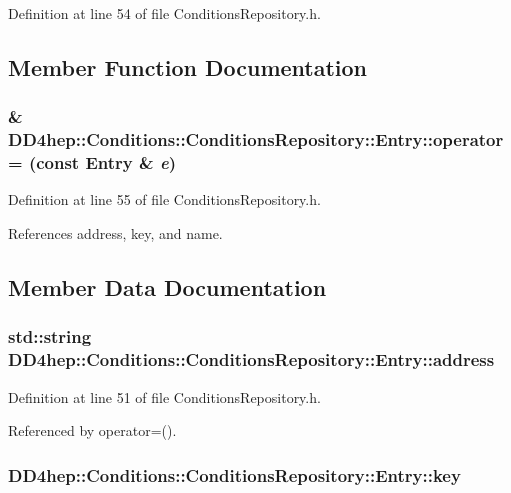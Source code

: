 Definition at line 54 of file ConditionsRepository.h.

\subsection{Member Function Documentation}
\hypertarget{class_d_d4hep_1_1_conditions_1_1_conditions_repository_1_1_entry_a6d1dd37eaf5e954821998aaa3daa42a3}{
\subsubsection[{operator=}]{\& DD4hep::Conditions::ConditionsRepository::Entry::operator= (const {\bf Entry} \& {\em e})}}
\label{class_d_d4hep_1_1_conditions_1_1_conditions_repository_1_1_entry_a6d1dd37eaf5e954821998aaa3daa42a3}


Definition at line 55 of file ConditionsRepository.h.

References address, key, and name.

\subsection{Member Data Documentation}
\hypertarget{class_d_d4hep_1_1_conditions_1_1_conditions_repository_1_1_entry_a6a105e657ab13c08b36b5e0e5be73deb}{
\subsubsection[{address}]{\setlength{\rightskip}{0pt plus 5cm}std::string {\bf DD4hep::Conditions::ConditionsRepository::Entry::address}}}
\label{class_d_d4hep_1_1_conditions_1_1_conditions_repository_1_1_entry_a6a105e657ab13c08b36b5e0e5be73deb}


Definition at line 51 of file ConditionsRepository.h.

Referenced by operator=().\hypertarget{class_d_d4hep_1_1_conditions_1_1_conditions_repository_1_1_entry_a2dff42077683b05077ecebdd3f4e1e0d}{
\subsubsection[{key}]{ {\bf DD4hep::Conditions::ConditionsRepository::Entry::key}}}
\label{class_d_d4hep_1_1_conditions_1_1_conditions_repository_1_1_entry_a2dff42077683b05077ecebdd3f4e1e0d}


